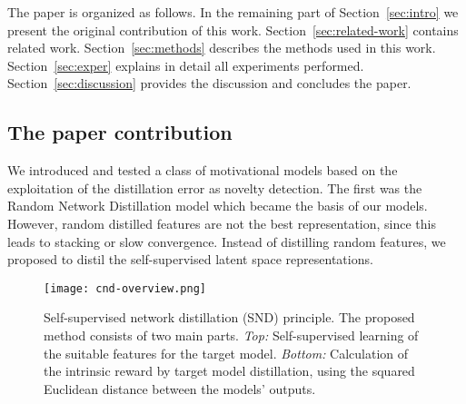\documentclass[a4paper,11pt]{elsarticle}
\begin{document}
The paper is organized as follows. In the remaining part of Section~\ref{sec:intro} we present the original contribution of this work. Section~\ref{sec:related-work} contains related work. Section~\ref{sec:methods} describes the methods used in this work. Section~\ref{sec:exper} explains in detail all experiments performed. Section~\ref{sec:discussion}  provides the discussion and concludes the paper.

\subsection{The paper contribution}
We introduced and tested a class of motivational models based on the exploitation of the distillation error as novelty detection. The first was the Random Network Distillation model \cite{burda2018exploration} which became the basis of our models. However, random distilled features are not the best representation, since this leads to stacking or slow convergence. Instead of distilling random features, we proposed to distil the self-supervised latent space representations. 

\begin{figure*}[thb]
\centering
\texttt{[image: cnd-overview.png]}
\caption{Self-supervised network distillation (SND) principle. The proposed method consists of two main parts. {\it Top:} Self-supervised learning of the suitable features for the target model. {\it Bottom:} Calculation of the intrinsic reward by target model distillation, using the squared Euclidean distance between the models' outputs.}
\label{fig:cnd_overview}
\end{figure*}
\end{document}
